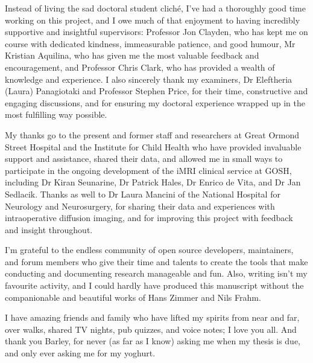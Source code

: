 \documentclass[12pt,phd,a4paper,twoside]{ucl_thesis}
\providecommand{\DIFaddtex}[1]{{\protect\color{blue} \sf #1}} %
\providecommand{\DIFaddbegin}{} %
\providecommand{\DIFaddend}{} %
\providecommand{\DIFadd}[1]{\texorpdfstring{\DIFaddtex{#1}}{#1}} %
\newcommand{\DIFaddincludegraphics}[2][]{{\color{blue}\fbox{\DIFOincludegraphics[#1]{#2}}}} %
\DeclareRobustCommand{\DIFaddbegin}{\DIFOaddbegin \let\includegraphics\DIFaddincludegraphics} %
\DeclareRobustCommand{\DIFaddend}{\DIFOaddend \let\includegraphics\DIFOincludegraphics} %
\begin{document}
\begin{acknowledgements}
  Instead of living the sad doctoral student cliché, I've had a thoroughly good time working on this project, and I owe much of that enjoyment to having incredibly supportive and insightful supervisors: Professor Jon Clayden, who has kept me on course with dedicated kindness, immeasurable patience, and good humour, Mr Kristian Aquilina, who has given me the most valuable feedback and encouragement, and Professor Chris Clark, who has provided a wealth of knowledge and experience.
  \DIFaddbegin \DIFadd{I also sincerely thank my examiners, Dr Eleftheria (Laura) Panagiotaki and Professor Stephen Price, for their time, constructive and engaging discussions, and for ensuring my doctoral experience wrapped up in the most fulfilling way possible.
}\DIFaddend 

  My thanks go to the present and former staff and researchers at Great Ormond Street Hospital and the Institute for Child Health who have provided invaluable support and assistance, shared their data, and allowed me in small ways to participate in the ongoing development of the iMRI clinical service at GOSH, including Dr Kiran Seunarine, Dr Patrick Hales, Dr Enrico de Vita, and Dr Jan Sedlacik. Thanks as well to Dr Laura Mancini of the National Hospital for Neurology and Neurosurgery, for sharing their data and experiences with intraoperative diffusion imaging, and for improving this project with feedback and insight throughout.

  I'm grateful to the endless community of open source developers, maintainers, and forum members who give their time and talents to create the tools that make conducting and documenting research manageable and fun. Also, writing isn't my favourite activity, and I could hardly have produced this manuscript without the companionable and beautiful works of Hans Zimmer and Nils Frahm.

  I have amazing friends and family who have lifted my spirits from near and far, over walks, shared TV nights, pub quizzes, and voice notes; I love you all. And thank you Barley, for never (as far as I know) asking me when my thesis is due, and only ever asking me for my yoghurt.
\end{acknowledgements}
\end{document}

